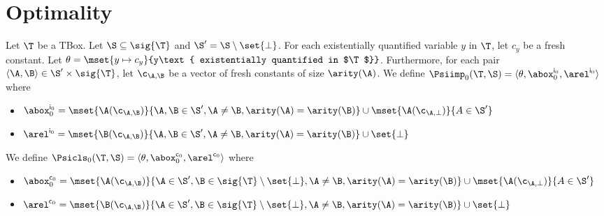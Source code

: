 \section{Optimality}

\begin{definition}
  Let $\T$ be a TBox. Let $\S\subseteq \sig{\T}$ and $\S'=\S\setminus\set{\bot}$. For each
  existentially quantified variable $y$ in $\T$, let $c_{y}$ be a
  fresh constant. Let $\theta=\mset{y\mapsto
    c_{y}}{y\text{ existentially quantified in $\T$}}$. Furthermore, for each pair
  $\langle\A,\B\rangle\in\S'\times\sig{\T}$, let $\c_{\A,\B}$ be a vector of
  fresh constants of size $\arity(\A)$. We define
  $\Psiimp_0(\T,\S)=\langle\theta,\abox^{\mathsf{i}_0}_0,\arel^{\mathsf{i}_0}\rangle$
  where
  \begin{itemize}
  \item $\abox_0^{\mathsf{i}_0}=\mset{\A(\c_{\A,\B})}{\A,\B\in\S',\A\ne\B,\arity(\A)=\arity(\B)}\cup\mset{\A(\c_{\A,\bot})}{A\in\S'}$
  \item $\arel^{\mathsf{i}_0}=\mset{\B(\c_{\A,\B})}{\A,\B\in\S',\A\ne\B,\arity(\A)=\arity(\B)}\cup\set{\bot}$
  \end{itemize}
  We define $\Psicls_0(\T,\S)=\langle\theta,\abox_0^{\mathsf{c}_0},\arel^{\mathsf{c}_0}\rangle$ where
  \begin{itemize}
  \item $\abox^{\mathsf{c}_0}_0=\mset{\A(\c_{\A,\B})}{\A\in\S',\B\in\sig{\T}\setminus\set{\bot},\A\ne\B,\arity(\A)=\arity(\B)}\cup\mset{\A(\c_{\A,\bot})}{A\in\S'}$
  \item $\arel^{\mathsf{c}_0}=\mset{\B(\c_{\A,\B})}{\A\in\S',\B\in\sig{\T}\setminus\set{\bot},\A\ne\B,\arity(\A)=\arity(\B)}\cup\set{\bot}$
  \end{itemize}

\end{definition}
